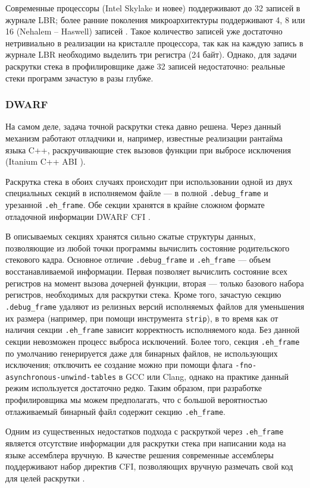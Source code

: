 Современные процессоры (Intel Skylake и новее) поддерживают до 32 записей в журнале LBR;
более ранние поколения микроархитектуры поддерживают 4, 8 или 16 (Nehalem – Haswell) записей \cite{lbr:lwn}.
Такое количество записей уже достаточно нетривиально в реализации на кристалле процессора,
так как на каждую запись в журнале LBR необходимо выделить три регистра (24 байт).
Однако, для задачи раскрутки стека в профилировщике даже 32 записей недостаточно: реальные стеки программ зачастую в разы глубже.

\subsubsection{DWARF}
На самом деле, задача точной раскрутки стека давно решена.
Через данный механизм работают отладчики и, например, известные реализации рантайма языка C++,
раскручивающие стек вызовов функции при выбросе исключения (Itanium C++ ABI \cite{itanium:eh}).

Раскрутка стека в обоих случаях происходит при использовании одной из двух специальных секций в исполняемом файле ---
в полной \verb!.debug_frame! и урезанной \verb!.eh_frame!.
Обе секции хранятся в крайне сложном формате отладочной информации DWARF CFI \cite{dwarf}.

В описываемых секциях хранятся сильно сжатые структуры данных, позволяющие из любой точки программы вычислить
состояние родительского стекового кадра. Основное отличие \verb!.debug_frame! и \verb!.eh_frame! --- объем восстанавливаемой информации.
Первая позволяет вычислить состояние всех регистров на момент вызова дочерней функции, вторая --- только базового набора регистров,
необходимых для раскрутки стека.
Кроме того, зачастую секцию \verb!.debug_frame! удаляют из релизных версий исполняемых файлов для уменьшения их размера
(например, при помощи инструмента \verb!strip!), в то время как от наличия секции \verb!.eh_frame!
зависит корректность исполняемого кода. Без данной секции невозможен процесс выброса исключений.
Более того, секция \verb!.eh_frame! по умолчанию генерируется даже для бинарных файлов, не использующих исключения;
отключить ее создание можно при помощи флага \verb!-fno-asynchronous-unwind-tables! в GCC или Clang, однако на практике
данный режим используется достаточно редко.
Таким образом, при разработке профилировщика мы можем предполагать, что с большой вероятностью отлаживаемый бинарный файл содержит
секцию \verb!.eh_frame!.

Одним из существенных недостатков подхода с раскруткой через \verb!.eh_frame! является отсутствие информации для раскрутки стека
при написании кода на языке ассемблера вручную. В качестве решения современные ассемблеры поддерживают набор директив CFI, позволяющих
вручную размечать свой код для целей раскрутки \cite{cfi:directives}.

